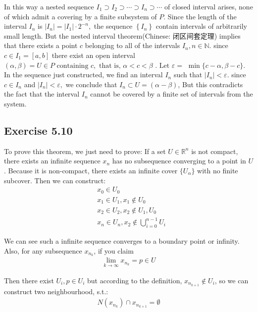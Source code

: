 \documentclass[]{ctexart}
\begin{document}
		In this way a nested sequence $I_{1} \supset I_{2} \supset \cdots \supset I_{n} \supset \cdots$ of closed interval arises, none of which admit a covering by a finite subsystem of $P$. Since the length of the interval $I_{n}$ is $\left|I_{n}\right|=\left|I_{1}\right| \cdot 2^{-n},$ the sequence $\left\{I_{n}\right\}$ contain intervals of arbitrarily small length. But the nested interval theorem(Chinese: 闭区间套定理) implies that there exists a point $c$ belonging to all of the intervals $I_{n}, n \in \mathbb{N} .$ since $c \in I_{1}=[a, b]$ there exist an open interval $(\alpha, \beta)=U \in P \text { containing } c, \text { that is, } \alpha<c<\beta \text { . Let } \varepsilon=$ $\min \{c-\alpha, \beta-c\} .$ In the sequence just constructed, we find an interval $I_{n}$ such that $\left|I_{n}\right|<\varepsilon$. since $c \in I_{n}$ and $\left|I_{n}\right|<\varepsilon,$ we conclude that $I_{n} \subset U= (\alpha-\beta)$, But this contradicts the fact that the interval $I_{n}$ cannot be covered by a finite set of intervals from the system.
	
	\subsection{Exercise 5.10}
		To prove this theorem, we just need to prove: If a set $U\in \mathbb{R}^n$ is not compact, there exists an infinite sequence $x_n$ has no subsequence converging to a point in $U$. Because it is non-compact, there exists an infinite cover $\{U_{\alpha}\}$ with no finite subcover. Then we can construct:
			\begin{equation*}
			\begin{aligned}
				&x_0\in U_0\\
				&x_1\in U_1, x_1\not\in U_0\\
				&x_2\in U_2, x_2\not \in U_1,U_0\\
				&x_n\in U_n, x_2\not \in \bigcup_{i=0}^{n-1}U_i
			\end{aligned}
			\end{equation*}
		
		We can see such a infinite sequence converges to a boundary point or infinity. Also, for any subsequence $x_{n_k}$, if you claim 
			\begin{equation*}
			\begin{aligned}
				\lim_{k\rightarrow\infty}x_{n_k}=p\in U
			\end{aligned}
			\end{equation*}
		
		Then there exist $U_i,p\in U_i$ but according to the definition, $x_{n_{k+1}}\not \in U_i$, so we can construct two neighbourhood, s.t.:
			\begin{equation*}
			\begin{aligned}
				N(x_{n_k})\cap x_{n_{k+1}}=\emptyset
			\end{aligned}
			\end{equation*}
		
\end{document}
